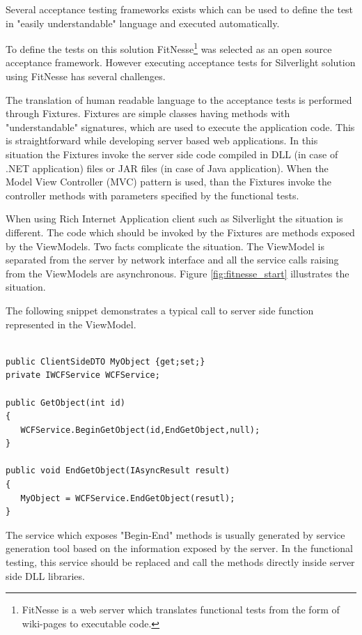 Several acceptance testing frameworks exists which can be used to define the test in "easily understandable" language and executed automatically.

To define the tests on this solution FitNesse\footnote{FitNesse is a web server which translates functional tests from the form of wiki-pages to executable code.} was selected as an open source acceptance framework. However executing acceptance tests for Silverlight solution using FitNesse has several challenges.

The translation of human readable language to the acceptance tests is performed through Fixtures. Fixtures are simple classes having methods with "understandable" signatures, which are used to execute the application code. This is straightforward while developing server based web applications. In this situation the Fixtures invoke the server side code compiled in DLL (in case of .NET application) files or JAR files (in case of Java application). When the Model View Controller (MVC) pattern is used, than the Fixtures invoke the controller methods with parameters specified by the functional tests.

When using Rich Internet Application client such as Silverlight the situation is different. The code which should be invoked by the Fixtures are methods exposed by the ViewModels. Two facts complicate the situation. The ViewModel is separated from the server by network interface and all the service calls raising from the ViewModels are asynchronous. Figure \ref{fig:fitnesse_start} illustrates the situation.

The following snippet demonstrates a typical call to server side function represented in the ViewModel.

\begin{verbatim}

public ClientSideDTO MyObject {get;set;}
private IWCFService WCFService;

public GetObject(int id)
{
   WCFService.BeginGetObject(id,EndGetObject,null);
}

public void EndGetObject(IAsyncResult result)
{
   MyObject = WCFService.EndGetObject(resutl);
}
\end{verbatim}
The service which exposes "Begin-End" methods is usually generated by service generation tool based on the information exposed by the server. In the functional testing, this service should be replaced and call the methods directly inside server side DLL libraries.

